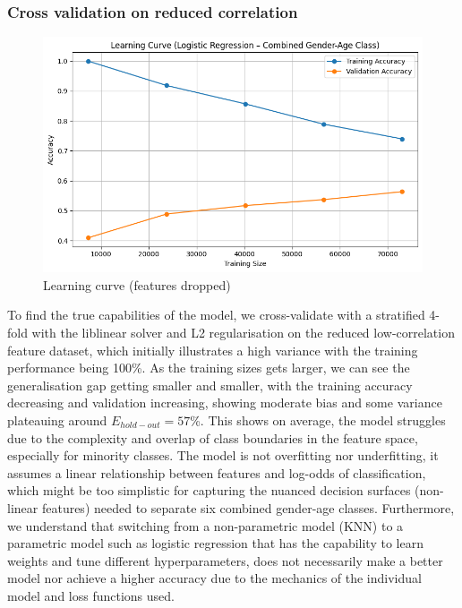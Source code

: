 \documentclass[10pt,twocolumn]{article}
\begin{document}
\subsubsection{Cross validation on reduced correlation}
\begin{figure}[H]
    \centering
    \includegraphics[width=1\linewidth]{images/lr/cross-validation - reduced.png}
    \caption{Learning curve (features dropped)}
    \label{fig:lr-learning-curve}
\end{figure}
To find the true capabilities of the model, we cross-validate with a stratified 4-fold with the liblinear solver and L2 regularisation on the reduced low-correlation feature dataset, which initially illustrates a high variance with the training performance being 100\%. As the training sizes gets larger, we can see the generalisation gap getting smaller and smaller, with the training accuracy decreasing and validation increasing, showing moderate bias and some variance plateauing around $E_{hold-out}=57$\%. This shows on average, the model struggles due to the complexity and overlap of class boundaries in the feature space, especially for minority classes. The model is not overfitting nor underfitting, it assumes a linear relationship between features and log-odds of classification, which might be too simplistic for capturing the nuanced decision surfaces (non-linear features) needed to separate six combined gender-age classes. Furthermore, we understand that switching from a non-parametric model (KNN) to a parametric model such as logistic regression that has the capability to learn weights and tune different hyperparameters, does not necessarily make a better model nor achieve a higher accuracy due to the mechanics of the individual model and loss functions used.
\end{document}
